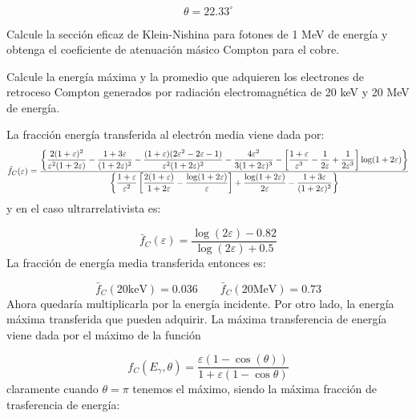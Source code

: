 \begin{equation*}
    \theta = 22.33 ^\circ
\end{equation*}



\begin{Ejercicio}{}
    Calcule la sección eficaz de Klein-Nishina para fotones de 1 MeV de energía y obtenga el coeficiente de atenuación másico Compton para el cobre.
\end{Ejercicio}

\begin{Ejercicio}{} 
    Calcule la energía máxima y la promedio que adquieren los electrones de retroceso Compton generados por radiación electromagnética de 20 keV y 20 MeV de energía.
\end{Ejercicio}

La fracción energía transferida al electrón media viene dada por: 
\begin{equation} \scriptsize
\bar{f}_C(\varepsilon) =
\frac{
\left\{
\dfrac{2(1+\varepsilon)^2}{\varepsilon^2(1+2\varepsilon)}
- \dfrac{1+3\varepsilon}{(1+2\varepsilon)^2}
- \dfrac{(1+\varepsilon)(2\varepsilon^2 - 2\varepsilon - 1)}{\varepsilon^2(1+2\varepsilon)^2}
- \dfrac{4\varepsilon^2}{3(1+2\varepsilon)^3}
- \left[\dfrac{1+\varepsilon}{\varepsilon^3} - \dfrac{1}{2\varepsilon} + \dfrac{1}{2\varepsilon^3}\right] \log(1+2\varepsilon)
\right\}
}{
\left\{
\dfrac{1+\varepsilon}{\varepsilon^2} \left[\dfrac{2(1+\varepsilon)}{1+2\varepsilon} - \dfrac{\log(1+2\varepsilon)}{\varepsilon}\right]
+ \dfrac{\log(1+2\varepsilon)}{2\varepsilon}
- \dfrac{1+3\varepsilon}{(1+2\varepsilon)^2}
\right\}
}
\end{equation}
y en el caso ultrarrelativista es: 

\begin{equation} 
\bar{f}_C(\varepsilon) = \frac{\log (2\varepsilon)-0.82}{\log(2\varepsilon)+0.5}
\end{equation}
La fracción de energía media transferida entonces es: 

\begin{equation*}
    \bar{f}_C(20\text{keV}) = 0.036 \qquad 
    \bar{f}_C(20\text{MeV}) = 0.73
\end{equation*}
Ahora quedaría multiplicarla por la energía incidente. Por otro lado, la energía máxima transferida que pueden adquirir. La máxima transferencia de energía viene dada por el máximo de la función

\begin{equation*}
    f_C(E_\gamma,\theta) = \frac{\varepsilon(1-\cos(\theta))}{1+\varepsilon(1-\cos \theta)}
\end{equation*}
claramente cuando $\theta=\pi$ tenemos el máximo, siendo la máxima fracción de trasferencia de energía: 


